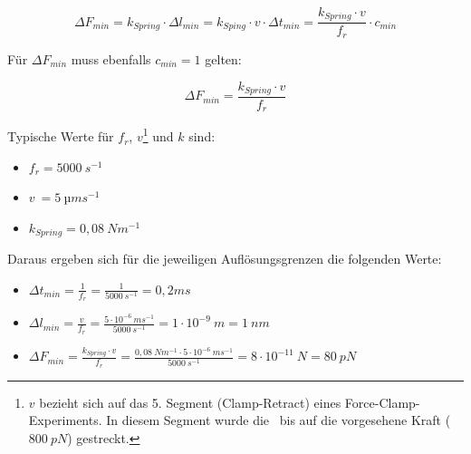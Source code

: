 \begin{equation}
	\Delta F_{min} = k_{Spring} \cdot \Delta l_{min} = k_{Sping} \cdot v \cdot \Delta t_{min} = \frac{k_{Spring} \cdot v}{f_r} \cdot c_{min}
\end{equation}

Für $\Delta F_{min}$ muss ebenfalls $c_{min} = 1$ gelten:

\begin{equation}
	\Delta F_{min} = \frac{k_{Spring} \cdot v}{f_r}
\end{equation}

Typische Werte für $f_r$, $v$\footnote{$v$ bezieht sich auf das 5. Segment (Clamp-Retract) eines Force-Clamp-Experiments. In diesem Segment wurde die \amid~bis auf die vorgesehene Kraft ($800~pN$) gestreckt.} und $k$ sind:

\begin{itemize}
	\item $f_r = 5000~s^{-1}$
	\item $v~= 5~µms^{-1}$
	\item $k_{Spring} = 0,08~Nm^{-1}$
\end{itemize}

Daraus ergeben sich für die jeweiligen Auflösungsgrenzen die folgenden Werte:

\begin{itemize}
	\item $\Delta t_{min} = \frac{1}{f_r} = \frac{1}{5000~s^{-1}} = 0,2 ms$
	\item $\Delta l_{min} = \frac{v}{f_r} = \frac{5 \cdot 10^{-6}~ms^{-1}}{5000~s^{-1}} = 1 \cdot 10^{-9}~m = 1~nm$
	\item $\Delta F_{min} = \frac{k_{Spring} \cdot v}{f_r} = \frac{0,08~Nm^{-1} \cdot 5 \cdot 10^{-6}~ms^{-1}}{5000~s^{-1}} = 8 \cdot 10^{-11}~N = 80~pN$
\end{itemize}